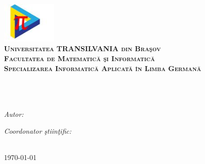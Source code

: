 \begin{titlepage}
\begin{center}
\includegraphics[width=0.2\textwidth]{./Pictures/LOGO.JPEG}\\[0.5cm]
\textsc{\LARGE \textbf{Universitatea TRANSILVANIA din Bra\c sov }}\\[0.5cm]
\textsc{\LARGE \textbf{Facultatea de Matematic\u a \c si Informatic\u a }}\\[0.5cm]
\textsc{\Large \textbf{Specializarea Informatic\u a Aplicat\u a \^ in Limba German\u a}}\\[3cm]

\HRule \\[0.4cm] %
{\large \bfseries \ttitle}\\[0.4cm] %
\HRule \\[1.5cm] %
 
\begin{minipage}{0.4\textwidth}
\begin{flushleft} \large
\emph{Autor:}\\
\authornames %
\end{flushleft}
\end{minipage}
\begin{minipage}{0.4\textwidth}
\begin{flushright} \large
\emph{Coordonator \c stiin\c tific:} \\
\supname %
\end{flushright}
\end{minipage}\\[8cm]
 


{\large \today}\\[4cm] %
 
\vfill
\end{center}

\end{titlepage}

